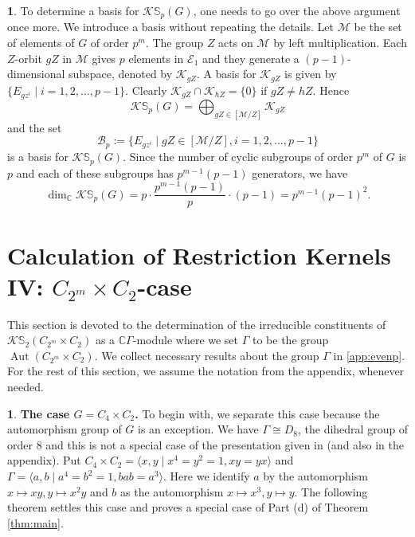\documentclass[12pt]{article}
\theoremstyle{plain}
\theoremstyle{definition}
\newtheorem{nothing}[theorem]{}
\newcommand{\kerlin}{\mathbb S_p}
\newcommand{\kerlint}{\mathbb S_2}
\newcommand{\Aut}{\operatorname{Aut}}
\begin{document}
\begin{nothing} To determine a basis for $\mathcal K\kerlin(G)$, one needs to go over the above argument once more. We introduce a basis without repeating the details. Let $\mathcal M$ be the set of elements of $G$ of order $p^m$. The group $Z$ acts on $\mathcal M$ by left multiplication. Each $Z$-orbit $gZ$ in $\mathcal M$ gives $p$ elements in $\mathcal E_1$ and they generate a $(p-1)$-dimensional subspace, denoted by $\mathcal K_{gZ}$. A basis for $\mathcal K_{gZ}$ is given by $\{ E_{gz^i}\mid i=1, 2, \ldots, p-1\}$. Clearly $\mathcal K_{gZ}\cap \mathcal K_{hZ} = \{0\}$
if $gZ\not = hZ$. Hence 
\[
\mathcal K\kerlin(G) = \bigoplus_{gZ\in [\mathcal M/Z]} \mathcal K_{gZ}
\]
and the set 
\[
\mathcal B_p:=\big\{ E_{gz^i} \mid gZ\in [\mathcal M/Z], i=1, 2, \ldots, p-1\big\}
\]
is a basis for $\mathcal K\kerlin(G)$. Since the number of cyclic subgroups of order $p^m$ of $G$ is $p$ and each of these subgroups has $p^{m-1}(p-1)$ generators, we have 
\[
\dim_\mathbb C\mathcal K\kerlin(G) = p\cdot \frac{p^{m-1}(p-1)}{p} \cdot (p-1)= p^{m-1}(p-1)^2.
\]
\end{nothing}






\section{Calculation of Restriction Kernels IV: $C_{2^m}\times C_2$-case}\label{sec:restker3}

This section is devoted to the determination of the irreducible constituents of $\mathcal K\kerlint(C_{2^m}\times C_2)$ as a $\mathbb C\Gamma$-module where we set $\Gamma$ to be the group $\Aut(C_{2^m}\times C_2)$. We collect necessary results about the group $\Gamma$ in \ref{app:evenp}. For the rest of this section, we assume the notation from the appendix, whenever needed.


\begin{nothing} {\bf The case $G= C_4\times C_2$.} To begin with, we separate this case 
because the automorphism group of $G$ is an exception.  We have $\Gamma  \cong D_8$, the dihedral group of order 8 and this is not a special case of the presentation given in \cite{BC} (and also in the appendix). Put $C_4\times C_2 = \langle x,  y\mid x^4 = y^2 = 1, xy = yx\rangle$ and $\Gamma = \langle a, b\mid a^4 = b^2 = 1, bab = a^3\rangle$. Here we identify $a$ by the automorphism $x\mapsto xy, y\mapsto x^2y$ and $b$ as the automorphism $x\mapsto x^3, y\mapsto y$. The following theorem settles this case and proves a special case of Part (d) of Theorem \ref{thm:main}.
\end{nothing}
\end{document}
